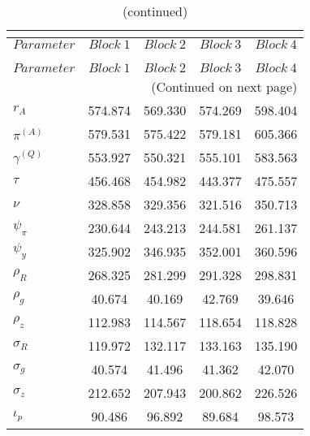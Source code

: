  
\begin{center}
\begin{longtable}{lcccc} 
\caption{MCMC Inefficiency factors per block}\\
 \label{Table:MCMC_inefficiency_factors}\\
\toprule 
$Parameter         $	 & 	 $     Block~1$	 & 	 $     Block~2$	 & 	 $     Block~3$	 & 	 $     Block~4$\\
\midrule \endfirsthead 
\caption{(continued)}\\
 \toprule \\ 
$Parameter         $	 & 	 $     Block~1$	 & 	 $     Block~2$	 & 	 $     Block~3$	 & 	 $     Block~4$\\
\midrule \endhead 
\midrule \multicolumn{5}{r}{(Continued on next page)} \\ \bottomrule \endfoot 
\bottomrule \endlastfoot 
$ {r_{A}}          $	 & 	     574.874	 & 	     569.330	 & 	     574.269	 & 	     598.404 \\ 
$ {\pi^{(A)}}      $	 & 	     579.531	 & 	     575.422	 & 	     579.181	 & 	     605.366 \\ 
$ {\gamma^{(Q)}}   $	 & 	     553.927	 & 	     550.321	 & 	     555.101	 & 	     583.563 \\ 
$ {\tau}           $	 & 	     456.468	 & 	     454.982	 & 	     443.377	 & 	     475.557 \\ 
$ {\nu}            $	 & 	     328.858	 & 	     329.356	 & 	     321.516	 & 	     350.713 \\ 
$ {\psi_\pi}       $	 & 	     230.644	 & 	     243.213	 & 	     244.581	 & 	     261.137 \\ 
$ {\psi_y}         $	 & 	     325.902	 & 	     346.935	 & 	     352.001	 & 	     360.596 \\ 
$ {\rho_R}         $	 & 	     268.325	 & 	     281.299	 & 	     291.328	 & 	     298.831 \\ 
$ {\rho_{g}}       $	 & 	      40.674	 & 	      40.169	 & 	      42.769	 & 	      39.646 \\ 
$ {\rho_z}         $	 & 	     112.983	 & 	     114.567	 & 	     118.654	 & 	     118.828 \\ 
$ {\sigma_R}       $	 & 	     119.972	 & 	     132.117	 & 	     133.163	 & 	     135.190 \\ 
$ {\sigma_{g}}     $	 & 	      40.574	 & 	      41.496	 & 	      41.362	 & 	      42.070 \\ 
$ {\sigma_z}       $	 & 	     212.652	 & 	     207.943	 & 	     200.862	 & 	     226.526 \\ 
$ {\iota_p}        $	 & 	      90.486	 & 	      96.892	 & 	      89.684	 & 	      98.573 \\ 
\end{longtable}
 \end{center}
